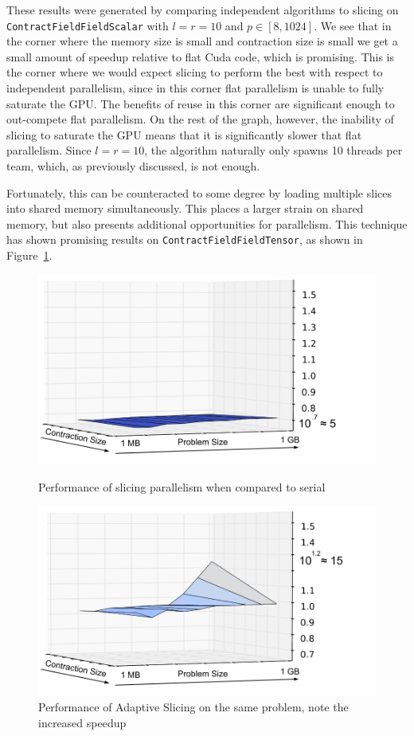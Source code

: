 These results were generated by comparing independent algorithms to slicing on
\texttt{ContractFieldFieldScalar} with $l = r = 10$ and $p \in [8,1024]$. We see
that in the corner where the memory size is small and contraction size is small
we get a small amount of speedup relative to flat Cuda code, which is
promising. This is the corner where we would expect slicing to perform the best
with respect to independent parallelism, since in this corner flat parallelism
is unable to fully saturate the GPU. The benefits of reuse in this corner are
significant enough to out-compete flat parallelism. On the rest of the graph,
however, the inability of slicing to saturate the GPU means that it is
significantly slower that flat parallelism. Since $l = r = 10$,
the algorithm naturally only spawns 10 threads per team, which, as previously discussed, is not enough. 

Fortunately, this can be counteracted to some degree by loading multiple slices 
into shared memory simultaneously. This places a larger strain on shared memory, 
but also presents additional opportunities for parallelism. 
This technique has shown promising results on \texttt{ContractFieldFieldTensor}, as shown in Figure~\ref{fig:TwoSlicings}. 

\begin{figure}[H]
    \centering
    \includegraphics[width=5in]{CFFTSlicingVSSerial}
    \caption{Performance of slicing parallelism when compared to serial}

    \includegraphics[width=5in]{CFFTAdaptiveSlicingVSSerial}
    \caption[Performance of adaptive slicing]{Performance of Adaptive Slicing on
    the same problem, note the increased speedup}
\label{fig:TwoSlicings}
\end{figure}

